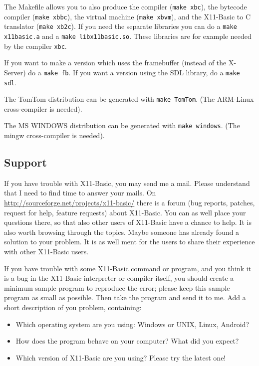 The Makefile allows you to also produce the compiler (\verb|make xbc|),  the
bytecode compiler (\verb|make xbbc|), the virtual  machine (\verb|make xbvm|),
and the X11-Basic to C translator (\verb|make xb2c|). If you  need the separate
libraries you can do a \verb|make x11basic.a| and a \verb|make libx11basic.so|.
These libraries are for example needed by the compiler \verb|xbc|. 

If you want to make a version which uses the framebuffer (instead of the
X-Server) do a \verb|make fb|. If you want a version using the SDL library, do a
\verb|make sdl|.

The TomTom distribution can be generated with \verb|make TomTom|. (The ARM-Linux
cross-compiler is needed).

The MS WINDOWS distribution can be generated with \verb|make windows|. (The
mingw cross-compiler is needed).


\subsection*{Support}

If you have trouble with X11-Basic, you may send me a mail. Please understand
that I need to find time to answer your mails. On 
\url{http://sourceforge.net/projects/x11-basic/} there is a forum (bug reports,
patches, request for help, feature requests) about X11-Basic. You can as well
place your questions there, so that also other users of X11-Basic have a chance
to help. It is also worth browsing through the topics. Maybe someone has already
found a solution to your problem. It is as well ment for the users to
share their experience with other X11-Basic users.

If you have trouble with some X11-Basic command or program, and you think it is
a bug in the X11-Basic interpreter or compiler itself, you should create  a
minimum sample program to reproduce the error; please keep this sample  program
as small as possible. Then take the program and send it to me. Add a short
description of you problem, containing:  
\begin{itemize} 
  \item Which operating system are you using: Windows or UNIX, Linux, Android?  
  \item How does the program behave on your computer? What did you expect?  
  \item Which version of X11-Basic are you using? Please try the latest one! 
\end{itemize}

